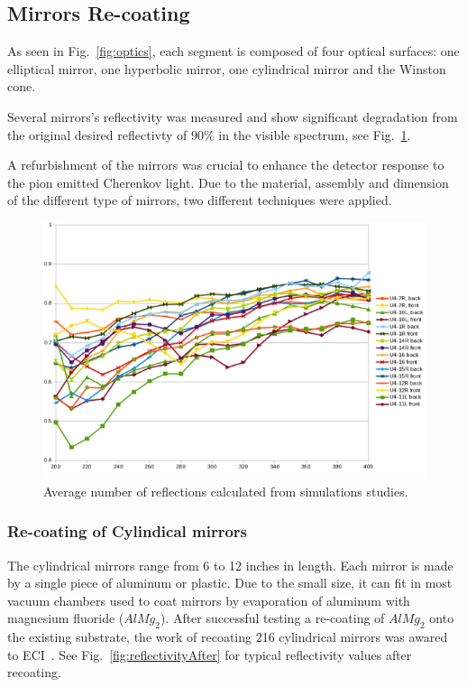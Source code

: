 \subsection{Mirrors Re-coating}

As seen in Fig.~\ref{fig:optics}, each segment is composed of four optical surfaces: one elliptical mirror,
one hyperbolic mirror, one cylindrical mirror and the Winston cone.

Several mirrors's reflectivity was measured and show significant degradation from the original
desired reflectivty of $90\%$ in the visible spectrum, see Fig.~\ref{fig:reflectivityBefore}.

A refurbishment of the mirrors was crucial to enhance the detector response to the pion emitted Cherenkov light.
Due to the material, assembly and dimension of the different type of mirrors, two different techniques were applied.

\begin{figure}[h]
\centering
	\includegraphics[width=1.0\columnwidth,keepaspectratio]{img/mirrorsReflectivityBefore.png}
	\caption{Average number of reflections calculated from simulations studies.}
	\label{fig:reflectivityBefore}
\end{figure}


\subsubsection{Re-coating of Cylindical mirrors}

The cylindrical mirrors range from 6 to 12 inches in length. Each mirror is made by a single piece of aluminum or plastic.
Due to the small size, it can fit in most vacuum chambers used to coat mirrors by evaporation of aluminum with magnesium fluoride
($AlMg_2$). After successful testing a re-coating of $AlMg_2$ onto the existing substrate, the work of recoating 216 cylindrical mirrors
was awared to ECI~\cite{ECI}. See Fig.~\ref{fig:reflectivityAfter} for typical reflectivity values after recoating.


